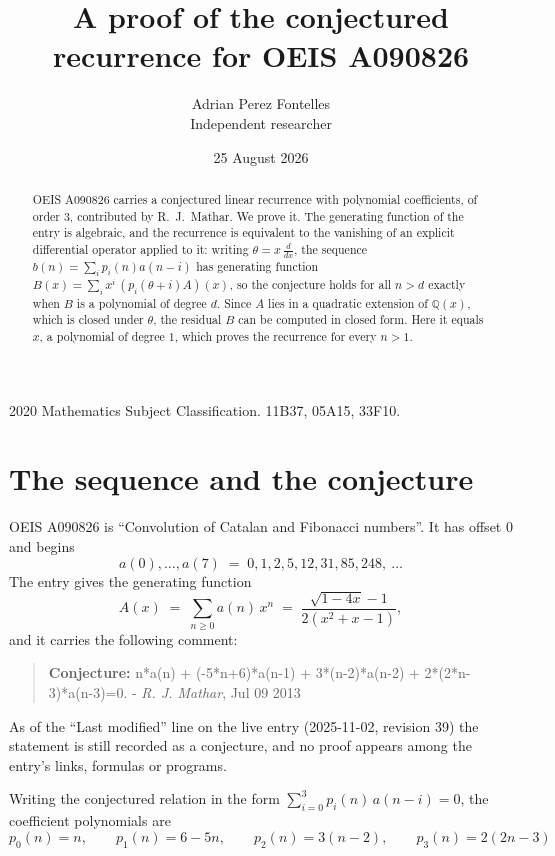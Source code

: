 \documentclass[11pt,a4paper]{article}
\title{A proof of the conjectured recurrence for OEIS A090826}
\author{Adrian Perez Fontelles\\ \small Independent researcher}
\date{25 August 2026}
\theoremstyle{plain}
\theoremstyle{definition}
\begin{document}
\maketitle

\begin{abstract}
OEIS A090826 carries a conjectured linear recurrence with polynomial coefficients, of
order 3, contributed by R.~J.~Mathar. We prove it. The generating function of the
entry is algebraic, and the recurrence is equivalent to the vanishing of an explicit
differential operator applied to it: writing $\theta=x\,\frac{d}{dx}$, the sequence
$b(n)=\sum_{i}p_{i}(n)a(n-i)$ has generating function
$B(x)=\sum_{i}x^{i}\,(p_{i}(\theta+i)A)(x)$, so the conjecture holds for all $n>d$ exactly
when $B$ is a polynomial of degree $d$. Since $A$ lies in a quadratic extension of
$\mathbb{Q}(x)$, which is closed under $\theta$, the residual $B$ can be computed in
closed form. Here it equals $x$, a polynomial of degree $1$, which proves
the recurrence for every $n>1$.
\end{abstract}

\noindent\small 2020 Mathematics Subject Classification. 11B37, 05A15, 33F10.\normalsize

\section{The sequence and the conjecture}

OEIS A090826 is ``Convolution of Catalan and Fibonacci numbers''. It has offset $0$ and begins
\[
a(0),\dots,a(7)\;=\;0, 1, 2, 5, 12, 31, 85, 248,\ \dots
\]
The entry gives the generating function
\begin{equation}\label{eq:gf}
A(x)\;=\;\sum_{n\ge 0} a(n)\,x^{n}\;=\;\frac{\sqrt{1 - 4 x} - 1}{2 \left(x^{2} + x - 1\right)} ,
\end{equation}
and it carries the following comment:
\begin{quote}\small
\textbf{Conjecture:} n*a(n) + (-5*n+6)*a(n-1) + 3*(n-2)*a(n-2) + 2*(2*n-3)*a(n-3)=0. - \emph{R. J. Mathar}, Jul 09 2013
\end{quote}
As of the ``Last modified'' line on the live entry (2025-11-02, revision 39) the
statement is still recorded as a conjecture, and no proof appears among the entry's links,
formulas or programs.

Writing the conjectured relation in the form $\sum_{i=0}^{3}p_{i}(n)\,a(n-i)=0$,
the coefficient polynomials are
\[
p_{0}(n)=n,\qquad p_{1}(n)=6 - 5 n,\qquad p_{2}(n)=3 \left(n - 2\right),\qquad p_{3}(n)=2 \left(2 n - 3\right)
\]
\end{document}
